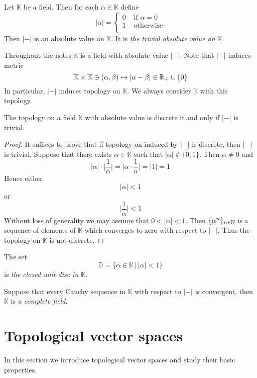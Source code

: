 \begin{example}\label{example:trivial_absolute_value}
Let $\mathbb{K}$ be a field. Then for each $\alpha \in \mathbb{K}$ define
$$|\alpha| = \begin{cases}
0&\mbox{ if }\alpha = 0\\
1&\mbox{ otherwise}\\
\end{cases}$$
Then $|-|$ is an absolute value on $\mathbb{K}$. It is \textit{the trivial absolute value on $\mathbb{K}$}.
\end{example}
\noindent
Throughout the notes $\mathbb{K}$ is a field with absolute value $|-|$. Note that $|-|$ induces metric 
$$\mathbb{K}\times \mathbb{K} \ni \left(\alpha, \beta\right) \mapsto |\alpha - \beta|\in {\mathbb R}_+\cup \{0\}$$
In particular, $|-|$ induces topology on $\mathbb{K}$. We always consider $\mathbb{K}$ with this topology.

\begin{fact}\label{fact:trivial_absolute_value_is_the_same_as_discrete_topology}
The topology on a field $\mathbb{K}$ with absolute value is discrete if and only if $|-|$ is trivial.
\end{fact}
\begin{proof}
It suffices to prove that if topology on induced by $|-|$ is discrete, then $|-|$ is trivial. Suppose that there exists $\alpha \in \mathbb{K}$ such that $|\alpha| \not \in \{0,1\}$. Then $\alpha \neq 0$ and 
$$|\alpha|\cdot \bigg|\frac{1}{\alpha}\bigg| = \bigg|\alpha \cdot \frac{1}{\alpha}\bigg| = |1| = 1$$
Hence either 
$$|\alpha| < 1$$ 
or
$$\bigg|\frac{1}{\alpha}\bigg| < 1$$
Without loss of generality we may assume that $0 < |\alpha| < 1$. Then $\{\alpha^n\}_{n\in {\mathbb N}}$ is a sequence of elements of $\mathbb{K}$ which converges to zero with respect to $|-|$. Thus the topology on $\mathbb{K}$ is not discrete.
\end{proof}

\begin{definition}
The set
$$\mathbb{D} = \big\{\alpha \in \mathbb{K}\,\big|\,|\alpha| < 1\big\}$$
is \textit{the closed unit disc in $\mathbb{K}$}.
\end{definition}

\begin{definition}
Suppose that every Cauchy sequence in $\mathbb{K}$ with respect to $|-|$ is convergent, then $\mathbb{K}$ is \textit{a complete field}.   
\end{definition}

\section{Topological vector spaces}
\noindent
In this section we introduce topological vector spaces and study their basic properties.

